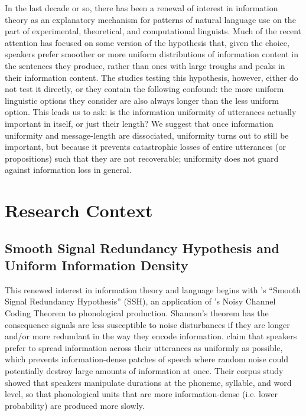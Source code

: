 \documentclass[12pt]{article}
\begin{document}
In the last decade or so, there has been a renewal of interest in information theory as an explanatory mechanism for patterns of natural language use on the part of experimental, theoretical, and computational linguists. Much of the recent attention has focused on some version of the hypothesis that, given the choice, speakers prefer smoother or more uniform distributions of information content in the sentences they produce, rather than ones with large troughs and peaks in their information content. The studies testing this hypothesis, however, either do not test it directly, or they contain the following confound: the more uniform linguistic options they consider are also always longer than the less uniform option. This leads us to ask: is the information uniformity of utterances actually important in itself, or just their length? We suggest that once information uniformity and message-length are dissociated, uniformity turns out to still be important, but because it prevents catastrophic losses of entire utterances (or propositions) such that they are not recoverable; uniformity does not guard against information loss in general. 

\section{Research Context}
\label{context}

\subsection{Smooth Signal Redundancy Hypothesis and Uniform Information Density}

This renewed interest in information theory and language begins with \citet{aylettturk2004}'s ``Smooth Signal Redundancy Hypothesis'' (SSH), an application of \citet{shannon1948}'s Noisy Channel Coding Theorem to phonological production. Shannon's theorem has the consequence signals are less susceptible to noise disturbances if they are longer and/or more redundant in the way they encode information. \citet{aylettturk2004} claim that speakers prefer to spread information across their utterances as uniformly as possible, which prevents information-dense patches of speech where random noise could potentially destroy large amounts of information at once. Their corpus study showed that speakers manipulate durations at the phoneme, syllable, and word level, so that phonological units that are more information-dense (i.e. lower probability) are produced more slowly.
\end{document}
